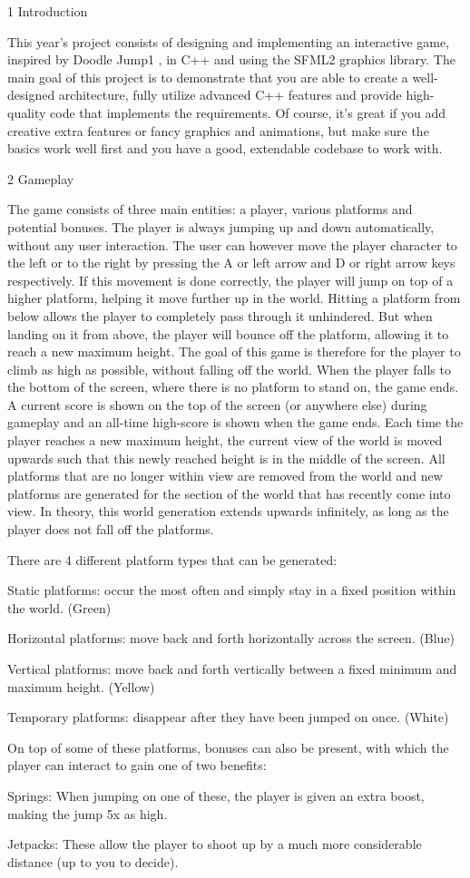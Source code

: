 1 Introduction

This year’s project consists of designing and implementing an interactive game, inspired by Doodle Jump1 , in C++ and using the S\+F\+M\+L2 graphics library. The main goal of this project is to demonstrate that you are able to create a well-\/designed architecture, fully utilize advanced C++ features and provide high-\/quality code that implements the requirements. Of course, it’s great if you add creative extra features or fancy graphics and animations, but make sure the basics work well first and you have a good, extendable codebase to work with.

2 Gameplay

The game consists of three main entities\+: a player, various platforms and potential bonuses. The player is always jumping up and down automatically, without any user interaction. The user can however move the player character to the left or to the right by pressing the A or left arrow and D or right arrow keys respectively. If this movement is done correctly, the player will jump on top of a higher platform, helping it move further up in the world. Hitting a platform from below allows the player to completely pass through it unhindered. But when landing on it from above, the player will bounce off the platform, allowing it to reach a new maximum height. The goal of this game is therefore for the player to climb as high as possible, without falling off the world. When the player falls to the bottom of the screen, where there is no platform to stand on, the game ends. A current score is shown on the top of the screen (or anywhere else) during gameplay and an all-\/time high-\/score is shown when the game ends. Each time the player reaches a new maximum height, the current view of the world is moved upwards such that this newly reached height is in the middle of the screen. All platforms that are no longer within view are removed from the world and new platforms are generated for the section of the world that has recently come into view. In theory, this world generation extends upwards infinitely, as long as the player does not fall off the platforms.

There are 4 different platform types that can be generated\+:

Static platforms\+: occur the most often and simply stay in a fixed position within the world. (Green)

Horizontal platforms\+: move back and forth horizontally across the screen. (Blue)

Vertical platforms\+: move back and forth vertically between a fixed minimum and maximum height. (Yellow)

Temporary platforms\+: disappear after they have been jumped on once. (White)

On top of some of these platforms, bonuses can also be present, with which the player can interact to gain one of two benefits\+:

Springs\+: When jumping on one of these, the player is given an extra boost, making the jump 5x as high.

Jetpacks\+: These allow the player to shoot up by a much more considerable distance (up to you to decide). 